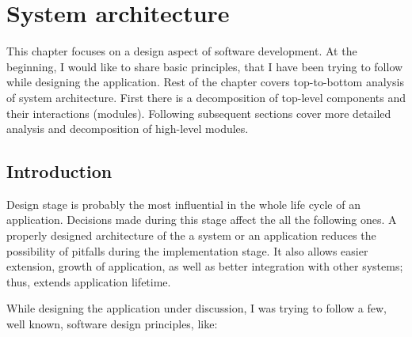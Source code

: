 %


\chapter{System architecture}
\label{cha:sys_arch}

\parbox{0.8\textwidth}{

{\small
This chapter focuses on a design aspect of software development. At the beginning, I would like to share basic principles, that I have been trying to follow while designing the application. Rest of the chapter covers top-to-bottom analysis of system architecture. First there is a decomposition of top-level components and their interactions (modules). Following subsequent sections cover more detailed analysis and decomposition of high-level modules.
}
}

\section{Introduction}
\label{sec:gui}

Design stage is probably the most influential in the whole life cycle of an application. Decisions made during this stage affect the all the following ones. A properly designed architecture of the a system or an application reduces the possibility of pitfalls during the implementation stage. It also allows easier extension, growth of application, as well as better integration with other systems; thus, extends application lifetime.

While designing the application under discussion, I was trying to follow a few, well known, software design principles, like:

